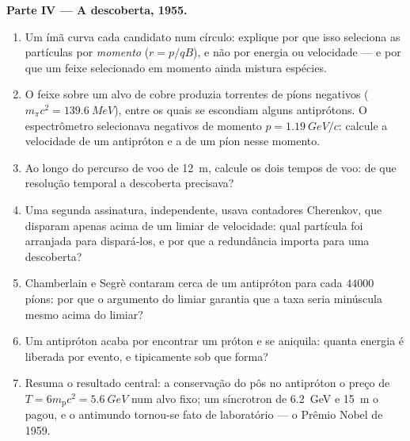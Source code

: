 \begin{problem}
\medskip\noindent\textbf{Parte IV --- A descoberta, 1955.}
\begin{enumerate}[resume]
  \item Um ímã curva cada candidato num círculo: explique por que isso
        seleciona as partículas por \emph{momento} ($r = p/qB$), e não
        por energia ou velocidade --- e por que um feixe selecionado
        em momento ainda mistura espécies.
  \item O feixe sobre um alvo de cobre produzia torrentes de píons
        negativos ($m_\pi c^2 = \qty{139.6}{MeV}$), entre os quais se
        escondiam alguns antiprótons. O espectrômetro selecionava
        negativos de momento $p = \qty{1.19}{GeV}/c$: calcule a
        velocidade de um antipróton e a de um píon nesse momento.
  \item Ao longo do percurso de voo de \qty{12}{m}, calcule os dois
        tempos de voo: de que resolução temporal a descoberta
        precisava?
  \item Uma segunda assinatura, independente, usava contadores
        Cherenkov, que disparam apenas acima de um limiar de
        velocidade: qual partícula foi arranjada para dispará-los, e
        por que a redundância importa para uma descoberta?
  \item Chamberlain e Segrè contaram cerca de um antipróton para cada
        $\num{44000}$ píons: por que o argumento do limiar garantia
        que a taxa seria minúscula mesmo acima do limiar?
  \item Um antipróton acaba por encontrar um próton e se aniquila:
        quanta energia é liberada por evento, e tipicamente sob que
        forma?
  \item Resuma o resultado central: a conservação do  pôs
        no antipróton o preço de $T = 6m_{\text{p}}c^2 =
        \qty{5.6}{GeV}$ num alvo fixo; um síncrotron de \qty{6.2}{GeV}
        e \qty{15}{m} o pagou, e o antimundo tornou-se fato de
        laboratório --- o Prêmio Nobel de 1959.
\end{enumerate}
\end{problem}
